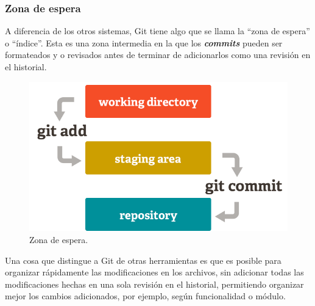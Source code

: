\documentclass[12pt, spanish, oneside, onecolumn, a4paper]{report}
\begin{document}
\subsubsection{Zona de espera}
\label{sec:stagingarea}

A diferencia de los otros sistemas, Git tiene algo que se llama la ``zona de espera'' o ``índice''. Esta es una zona intermedia en la que los \textbf{\emph{commits}} pueden ser formateados y o revisados antes de terminar de adicionarlos como una revisión en el historial.


\begin{figure}
  \begin{center}
  \includegraphics[width=.6\textwidth,keepaspectratio=true]{index1.png}
  \end{center}
  \caption{Zona de espera.}
\end{figure}


Una cosa que distingue a Git de otras herramientas es que es posible para organizar rápidamente las modificaciones en los archivos, sin adicionar todas las modificaciones hechas en una sola revisión en el historial, permitiendo organizar mejor los cambios adicionados, por ejemplo, según funcionalidad o módulo.



\glsaddall
\printglossaries
\end{document}
